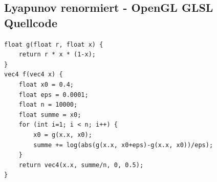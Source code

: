 \documentclass[12pt,a4paper]{article}
\begin{document}
\subsection{Lyapunov renormiert - OpenGL GLSL Quellcode}
\begin{lstlisting}
float g(float r, float x) {
    return r * x * (1-x);
}
vec4 f(vec4 x) {
    float x0 = 0.4;
    float eps = 0.0001;
    float n = 10000;
    float summe = x0;
    for (int i=1; i < n; i++) {
        x0 = g(x.x, x0);
        summe += log(abs(g(x.x, x0+eps)-g(x.x, x0))/eps);
    }
    return vec4(x.x, summe/n, 0, 0.5);
}
\end{lstlisting}
\nocite{*}
\printbibliography
\end{document}
